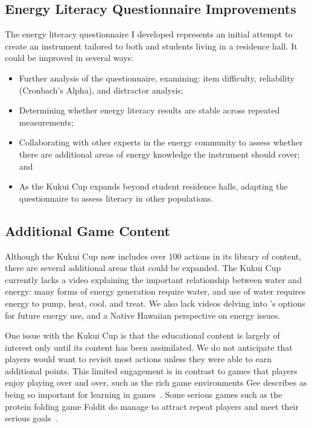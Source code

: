 \subsection{Energy Literacy Questionnaire Improvements}

The energy literacy questionnaire I developed represents an initial attempt to create an instrument tailored to both \Hawaii and students living in a residence hall. It could be improved in several ways:

\begin{itemize}
	\item Further analysis of the questionnaire, examining: item difficulty, reliability (Cronbach's Alpha), and distractor analysis;
	\item Determining whether energy literacy results are stable across repeated measurements;
	\item Collaborating with other experts in the \Hawaii energy community to assess whether there are additional areas of energy knowledge the instrument should cover; and
	\item As the Kukui Cup expands beyond student residence halls, adapting the questionnaire to assess literacy in other populations.
\end{itemize}


\subsection{Additional Game Content}

Although the Kukui Cup now includes over 100 actions in its library of content, there are several additional areas that could be expanded. The Kukui Cup currently lacks a video explaining the important relationship between water and energy: many forms of energy generation require water, and use of water requires energy to pump, heat, cool, and treat. We also lack videos delving into \Hawaii's options for future energy use, and a Native Hawaiian perspective on energy issues.

One issue with the Kukui Cup is that the educational content is largely of interest only until its content has been assimilated. We do not anticipate that players would want to revisit most actions unless they were able to earn additional points. This limited engagement is in contrast to games that players enjoy playing over and over, such as the rich game environments Gee describes as being so important for learning in games~\cite{Gee2007}. Some serious games such as the protein folding game Foldit do manage to attract repeat players and meet their serious goals~\cite{Khatib2011}.

